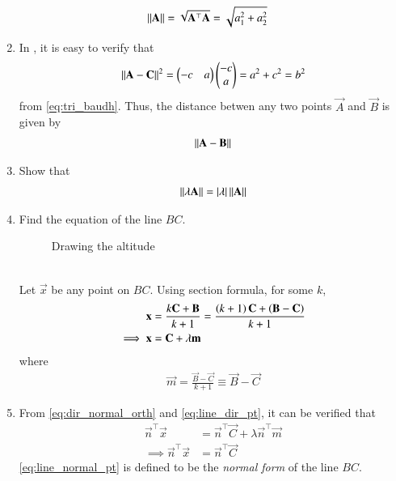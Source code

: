 \begin{enumerate}[label=\thesection.\arabic*.,ref=\thesection.\theenumi]
\begin{align}
	\left\lVert\mathbf{A}\right\rVert 
  &= \sqrt{\mathbf{A}^{\top} \mathbf{A}}= \sqrt{a_1^2+a_2^2}
\end{align}
\item In 
,	
it is easy to verify that 
\begin{align}
\left\lVert\mathbf{A}-\mathbf{C}\right\rVert^2  
  = \begin{pmatrix}-c & a\end{pmatrix} \begin{pmatrix}-c \\ a\end{pmatrix}
= a^2 + c^2 = b^2
\end{align}
from 
	\eqref{eq:tri_baudh}.
Thus, 
	the distance betwen any two  points $\vec{A}$ and $\vec{B}$ is given by 
\begin{align}
  \label{eq:norm2d_dist}
\left\lVert\mathbf{A}-\mathbf{B}\right\rVert 
\end{align}
\item Show that 
\begin{align}
  \label{eq:norm2d_const}
  \left\lVert\lambda \mathbf{A}\right\rVert 
  = \left\vert\lambda\right\vert \left\lVert\mathbf{A}\right\rVert
\end{align}
\item Find the equation of the line $BC$.
%
\begin{figure}[!ht]
	\begin{center}
		\resizebox{\columnwidth}{!}{}
	\end{center}
	\caption{Drawing the altitude}
	\label{fig:tri_alt}	
\end{figure}
\\
\solution Let $\vec{x}$ be any point on $BC$.  Using section formula, for some $k$, 
%
\begin{align}
\mathbf{x} &= \frac{k\mathbf{C}+\mathbf{B}}{k+1} = \frac{\left(k+1\right)\mathbf{C}+\left(\mathbf{B}-\mathbf{C}\right)}{k+1}
\\
\implies \mathbf{x} &= \mathbf{C} + \lambda \mathbf{m}
\label{eq:line_dir_pt}
\end{align}
%
where 
%
\begin{align}
\vec{m} 
 = \frac{\vec{B}-\vec{C}}{k+1} \equiv \vec{B}-\vec{C}
\label{eq:line_dir_pt-alt}
\end{align}
%
%
\item 
From \eqref{eq:dir_normal_orth} and \eqref{eq:line_dir_pt}, 
it can be verified that 
%
\begin{align}
\vec{n}^{\top}\vec{x} &= \vec{n}^{\top}\vec{C} + \lambda \vec{n}^{\top}\vec{m}
\\
\implies \vec{n}^{\top}\vec{x} &= \vec{n}^{\top}\vec{C}
\label{eq:line_normal_pt}
\end{align}
%
\eqref{eq:line_normal_pt} is defined to be the {\em normal form} of the line $BC$.  
\end{enumerate}
